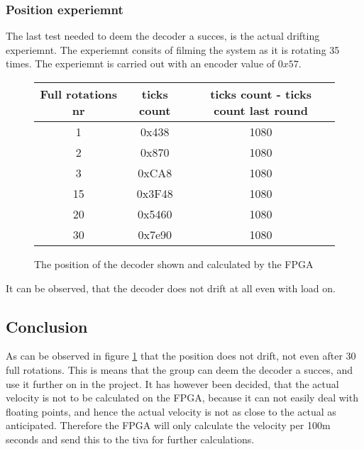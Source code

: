 \documentclass[../main]{subfiles}
\begin{document}
\subsubsection*{Position experiemnt}
The last test needed to deem the decoder a succes, is the actual drifting experiemnt. The experiemnt consits of filming the system as it is rotating 35 times. The experiemnt is carried out with an encoder value of $0x57$.
\begin{figure}[H]
\begin{center}
\begin{tabular}{ c c c}
 Full rotations nr & ticks count & ticks count - ticks count last round  \\
 \hline
 1  & 0x438  & 1080\\
 2  & 0x870  & 1080\\
 3  & 0xCA8  & 1080\\
 15 & 0x3F48 & 1080\\
 20 & 0x5460 & 1080\\
 30 & 0x7e90 & 1080 \\
\end{tabular}
\end{center}
\caption{The position of the decoder shown and calculated by the FPGA}
\label{fig:poition}
\end{figure}
It can be observed, that the decoder does not drift at all even with load on.
\subsection*{Conclusion}
As can be observed in figure \ref{fig:poition} that the position does not drift, not even after 30 full rotations. This is means that the group can deem the decoder a succes, and use it further on in the project. It has however been decided, that the actual velocity is not to be calculated on the FPGA, because it can not easily deal with floating points, and hence the actual velocity is not as close to the actual as anticipated. Therefore the FPGA will only calculate the velocity per 100m seconds and send this to the tiva for further calculations. 
\end{document}
